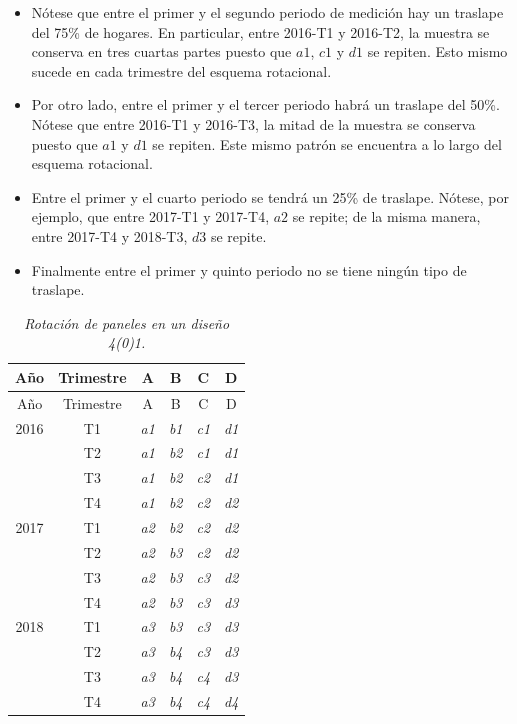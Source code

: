 \documentclass[
  12pt,
  spanish,
]{book}
\providecommand{\tightlist}{%
  \setlength{\itemsep}{0pt}\setlength{\parskip}{0pt}}
\begin{document}
\begin{itemize}
\tightlist
\item
  Nótese que entre el primer y el segundo periodo de medición hay un traslape del 75\% de hogares. En particular, entre 2016-T1 y 2016-T2, la muestra se conserva en tres cuartas partes puesto que \(a1\), \(c1\) y \(d1\) se repiten. Esto mismo sucede en cada trimestre del esquema rotacional.
\item
  Por otro lado, entre el primer y el tercer periodo habrá un traslape del 50\%. Nótese que entre 2016-T1 y 2016-T3, la mitad de la muestra se conserva puesto que \(a1\) y \(d1\) se repiten. Este mismo patrón se encuentra a lo largo del esquema rotacional.
\item
  Entre el primer y el cuarto periodo se tendrá un 25\% de traslape. Nótese, por ejemplo, que entre 2017-T1 y 2017-T4, \(a2\) se repite; de la misma manera, entre 2017-T4 y 2018-T3, \(d3\) se repite.
\item
  Finalmente entre el primer y quinto periodo no se tiene ningún tipo de traslape.
\end{itemize}

\begin{longtable}[]{@{}cccccc@{}}
\caption{\emph{Rotación de paneles en un diseño 4(0)1.}}\tabularnewline
\toprule
Año & Trimestre & A & B & C & D \\
\midrule
\endfirsthead
\toprule
Año & Trimestre & A & B & C & D \\
\midrule
\endhead
2016 & T1 & \emph{a1} & \emph{b1} & \emph{c1} & \emph{d1} \\
& T2 & \emph{a1} & \emph{b2} & \emph{c1} & \emph{d1} \\
& T3 & \emph{a1} & \emph{b2} & \emph{c2} & \emph{d1} \\
& T4 & \emph{a1} & \emph{b2} & \emph{c2} & \emph{d2} \\
2017 & T1 & \emph{a2} & \emph{b2} & \emph{c2} & \emph{d2} \\
& T2 & \emph{a2} & \emph{b3} & \emph{c2} & \emph{d2} \\
& T3 & \emph{a2} & \emph{b3} & \emph{c3} & \emph{d2} \\
& T4 & \emph{a2} & \emph{b3} & \emph{c3} & \emph{d3} \\
2018 & T1 & \emph{a3} & \emph{b3} & \emph{c3} & \emph{d3} \\
& T2 & \emph{a3} & \emph{b4} & \emph{c3} & \emph{d3} \\
& T3 & \emph{a3} & \emph{b4} & \emph{c4} & \emph{d3} \\
& T4 & \emph{a3} & \emph{b4} & \emph{c4} & \emph{d4} \\
\bottomrule
\end{longtable}
\end{document}
